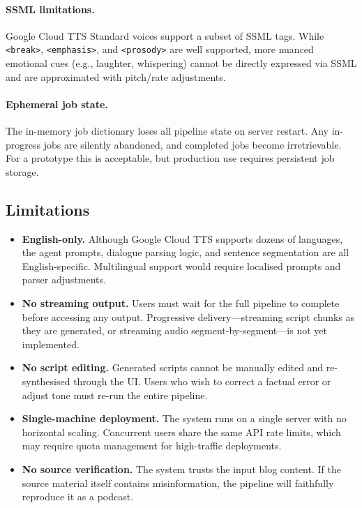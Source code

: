 \documentclass[sigconf,natbib=false]{acmart}   %
\begin{document}
\paragraph{SSML limitations.}
Google Cloud TTS Standard voices support a subset of SSML tags.  While \texttt{<break>}, \texttt{<emphasis>}, and \texttt{<prosody>} are well supported, more nuanced emotional cues (e.g., laughter, whispering) cannot be directly expressed via SSML and are approximated with pitch/rate adjustments.

\paragraph{Ephemeral job state.}
The in-memory job dictionary loses all pipeline state on server restart.  Any in-progress jobs are silently abandoned, and completed jobs become irretrievable.  For a prototype this is acceptable, but production use requires persistent job storage.

\subsection{Limitations}

\begin{itemize}[nosep]
  \item \textbf{English-only.}  Although Google Cloud TTS supports dozens of languages, the agent prompts, dialogue parsing logic, and sentence segmentation are all English-specific.  Multilingual support would require localised prompts and parser adjustments.
  \item \textbf{No streaming output.}  Users must wait for the full pipeline to complete before accessing any output.  Progressive delivery---streaming script chunks as they are generated, or streaming audio segment-by-segment---is not yet implemented.
  \item \textbf{No script editing.}  Generated scripts cannot be manually edited and re-synthesised through the UI.  Users who wish to correct a factual error or adjust tone must re-run the entire pipeline.
  \item \textbf{Single-machine deployment.}  The system runs on a single server with no horizontal scaling.  Concurrent users share the same API rate limits, which may require quota management for high-traffic deployments.
  \item \textbf{No source verification.}  The system trusts the input blog content.  If the source material itself contains misinformation, the pipeline will faithfully reproduce it as a podcast.
\end{itemize}
\end{document}
